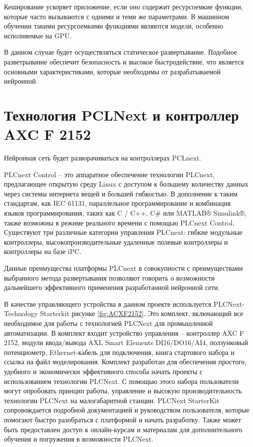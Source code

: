 Кеширование ускоряет приложение, если оно содержит ресурсоемкие функции, которые часто вызываются с одними и теми же параметрами. В машинном обучении такими ресурсоемкими функциями являются модели, особенно исполняемые на GPU.

В данном случае будет осуществляться статическое развертывание. Подобное разветрывание обеспечит безопасность и высокое быстродействие, что является основными характеристиками, которые необходимы от разрабатываемой нейронной.

\section{Технология PCLNext и контроллер AXC F 2152}

Нейронная сеть будет разворачиваться на контроллерах PCLnext.

PLCnext Control {--} это аппаратное обеспечение технологии PLCnext, предлагающее открытую среду Linux с доступом к большему количеству данных через системы интернета вещей и большей гибкостью. В дополнение к таким стандартам, как IEC 61131, параллельное программирование и комбинация языков программирования, таких как C / C++, C\# или MATLAB® Simulink®, также возможны в режиме реального времени с помощью PLCnext Control. Существуют три различные категории управления PLCnext: гибкие модульные контроллеры, высокопроизводительные удаленные полевые контроллеры и контроллеры на базе iPC.

Данные преимущества платформы PLCnext в совокупности с преимуществами выбранного метода развертывания позволяют говорить о возможности дальнейшего эффективного применения разработанной нейронной сети.

В качестве управляющего устройства в данном проекте используется PLCNext-Technology Starterkit  рисунке \ref{fig:ACXF2152}. Это комплект, включающий все необходимое для работы с технологией PLCNext для промышленной автоматизации. В комплект входит устройство управления {--} контроллер AXC F 2152, модули ввода/вывода AXL Smart Elements DI16/DO16/AI4, ползунковый потенциометр, Ethernet-кабель для подключения, книга стартового набора и ссылка на файл моделирования. Комплект разработан для обеспечения простого, удобного и экономически эффективного способа начать проекты с использованием технологии PLCNext. С помощью этого набора пользователи могут опробовать принцип работы, управление и высокую производительность технологии PLCNext на малогабаритной станции. PLCNext StarterKit сопровождается подробной документацией и руководством пользователя, которые помогают быстро разобраться с платформой и начать разработку. Также может быть предоставлен доступ к онлайн-курсам и материалам для дополнительного обучения и погружения в возможности PLCNext.

